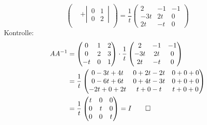 \begin{loesung}
\[\begin{pmatrix}
&+\left|\,\begin{matrix} 0&1\\0&2\end{matrix}\,\right|\\
\end{pmatrix}
=
\frac1t
\begin{pmatrix}
 2 &-1 &-1\\
-3t& 2t& 0\\
 2t& -t& 0
\end{pmatrix}
\]
Kontrolle:
\begin{align*}
AA^{-1}
&=
\begin{pmatrix}
 0& 1& 2\\
 0& 2& 3\\
-t& 0& 1
\end{pmatrix}
\cdot
\frac1t
\begin{pmatrix}
 2 &-1 &-1\\
-3t& 2t& 0\\
 2t& -t& 0
\end{pmatrix}
\\
&=
\frac1t
\begin{pmatrix}
0-3t+4t&0+2t-2t&0+0+0\\
0-6t+6t&0+4t-3t&0+0+0\\
-2t+0+2t&t+0-t&t+0+0
\end{pmatrix}
\\
&=\frac1t\begin{pmatrix}t&0&0\\0&t&0\\0&0&t\end{pmatrix}=I
\qedhere
\end{align*}
\end{loesung}

